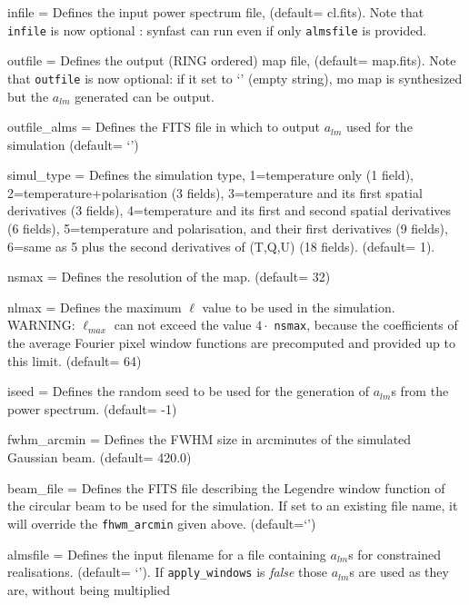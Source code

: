 \begin{qualifiers}
  \begin{qulistwide}{} %
    \item[{infile = }] Defines the input power spectrum file,
	(default= cl.fits). Note that {\tt infile} is now optional :
    synfast can run even if only {\tt almsfile} is provided.
    \item[{outfile = }] Defines the output (RING ordered) map file,
(default= map.fits). Note that {\tt outfile} is now optional: if it set to 
      `' (empty string),  mo map is synthesized but the $a_{lm}$ generated can be output.
    \item[{outfile\_alms = }] Defines the FITS file in which to output $a_{lm}$ used
      for the simulation (default= `')
     \item[{simul\_type = }] Defines the simulation type, 1=temperature only (1 field),
       2=temperature+polarisation (3 fields), 3=temperature and its first
spatial derivatives (3 fields),
       4=temperature and its first and second spatial derivatives (6 fields), 5=temperature
       and polarisation, and their first derivatives (9 fields), 6=same as 5
       plus the second derivatives of (T,Q,U) (18 fields).
(default= 1).
    \item[{nsmax = }] Defines the resolution of the map.
(default= 32)
     \item[{nlmax = }] Defines the maximum $\ell$ value 
to be used in the simulation. WARNING: $\ell_{max}$ can not exceed
the value $4\cdot$ {\tt nsmax}, because the coefficients of the  average Fourier 
pixel window functions
are precomputed and provided up to this limit.
(default= 64)
      \item[{iseed = }] Defines the random seed to be used 
for the generation of $a_{lm}$s from the power spectrum.
(default= -1)
    \item[{fwhm\_arcmin = }] Defines the FWHM size in arcminutes 
of the simulated Gaussian beam.
(default= 420.0)
%
    \item[{beam\_file = }] Defines the FITS file describing the
    Legendre window
    function of the circular beam to be used for the
    simulation. If set to an existing file name, it will override the
    {\tt fhwm\_arcmin} given above. (default=`')
%
     \item[{almsfile = }] Defines the input filename for a file
    containing $a_{lm}$s for constrained realisations. 
(default= `'). If {\tt apply\_windows} is {\em false} 
those $a_{lm}$s are used as they are, without being multiplied

\end{qulistwide}
\end{qualifiers}
